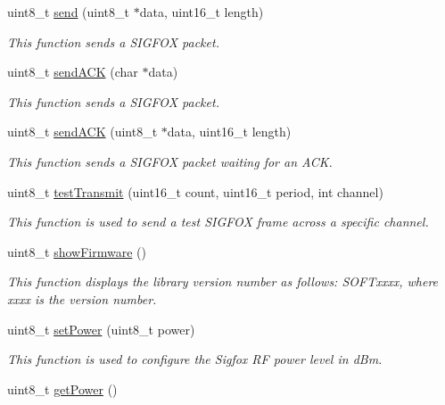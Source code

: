 \begin{DoxyCompactItemize}
uint8\+\_\+t \hyperlink{class_wasp_sigfox_aeea39eca699df0df353d40b4117d677f}{send} (uint8\+\_\+t $\ast$data, uint16\+\_\+t length)
\begin{DoxyCompactList}\small\item\em This function sends a S\+I\+G\+F\+OX packet. \end{DoxyCompactList}\item 
uint8\+\_\+t \hyperlink{class_wasp_sigfox_adebf4ec240b7771e237a865fc080b30f}{send\+A\+CK} (char $\ast$data)
\begin{DoxyCompactList}\small\item\em This function sends a S\+I\+G\+F\+OX packet. \end{DoxyCompactList}\item 
uint8\+\_\+t \hyperlink{class_wasp_sigfox_a6d9082a677a35653647724edbaf6ba72}{send\+A\+CK} (uint8\+\_\+t $\ast$data, uint16\+\_\+t length)
\begin{DoxyCompactList}\small\item\em This function sends a S\+I\+G\+F\+OX packet waiting for an A\+CK. \end{DoxyCompactList}\item 
uint8\+\_\+t \hyperlink{class_wasp_sigfox_a59c6d95b9462c3e498df47244f50c69c}{test\+Transmit} (uint16\+\_\+t count, uint16\+\_\+t period, int channel)
\begin{DoxyCompactList}\small\item\em This function is used to send a test S\+I\+G\+F\+OX frame across a specific channel. \end{DoxyCompactList}\item 
uint8\+\_\+t \hyperlink{class_wasp_sigfox_aec73b37fd38be39f37b0d9f592e518e3}{show\+Firmware} ()
\begin{DoxyCompactList}\small\item\em This function displays the library version number as follows\+: S\+O\+F\+Txxxx, where \textquotesingle{}xxxx\textquotesingle{} is the version number. \end{DoxyCompactList}\item 
uint8\+\_\+t \hyperlink{class_wasp_sigfox_abd98c9030d1a228b5638d866f8d99e5c}{set\+Power} (uint8\+\_\+t power)
\begin{DoxyCompactList}\small\item\em This function is used to configure the Sigfox RF power level in d\+Bm. \end{DoxyCompactList}\item 
uint8\+\_\+t \hyperlink{class_wasp_sigfox_a10edfb9d2762361574a9302226b4084a}{get\+Power} ()

\end{DoxyCompactItemize}
